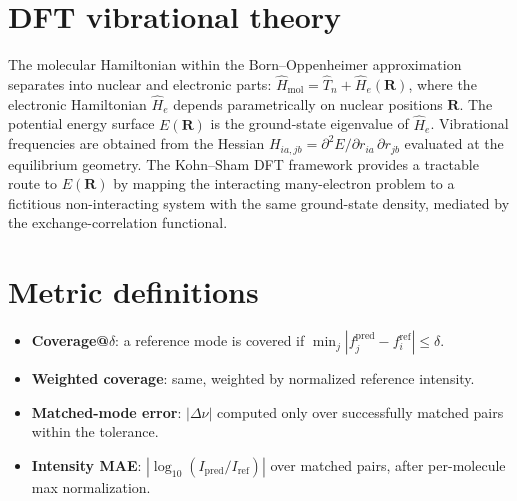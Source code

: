 \documentclass[10pt]{article}
\begin{document}



\appendix
\section{DFT vibrational theory}
\label{sec:appendix-dft}

The molecular Hamiltonian within the Born--Oppenheimer approximation separates into nuclear and electronic parts: $\hat{H}_{\mathrm{mol}} = \hat{T}_n + \hat{H}_e(\mathbf{R})$, where the electronic Hamiltonian $\hat{H}_e$ depends parametrically on nuclear positions $\mathbf{R}$. The potential energy surface $E(\mathbf{R})$ is the ground-state eigenvalue of $\hat{H}_e$. Vibrational frequencies are obtained from the Hessian $H_{ia,jb} = \partial^2 E / \partial r_{ia}\,\partial r_{jb}$ evaluated at the equilibrium geometry. The Kohn--Sham DFT framework provides a tractable route to $E(\mathbf{R})$ by mapping the interacting many-electron problem to a fictitious non-interacting system with the same ground-state density, mediated by the exchange-correlation functional.

\section{Metric definitions}
\label{sec:appendix-metrics}

\begin{itemize}
    \item \textbf{Coverage@$\delta$}: a reference mode is covered if $\min_j |f_j^{\mathrm{pred}} - f_i^{\mathrm{ref}}| \leq \delta$.
    \item \textbf{Weighted coverage}: same, weighted by normalized reference intensity.
    \item \textbf{Matched-mode error}: $|\Delta\nu|$ computed only over successfully matched pairs within the tolerance.
    \item \textbf{Intensity MAE}: $|\log_{10}(I_{\mathrm{pred}}/I_{\mathrm{ref}})|$ over matched pairs, after per-molecule max normalization.
\end{itemize}
\end{document}

